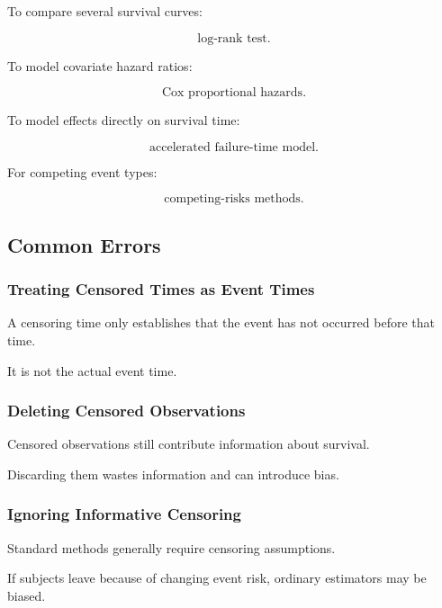 To compare several survival curves:

\[
\boxed{
\text{log-rank test}.
}
\]

To model covariate hazard ratios:

\[
\boxed{
\text{Cox proportional hazards}.
}
\]

To model effects directly on survival time:

\[
\boxed{
\text{accelerated failure-time model}.
}
\]

For competing event types:

\[
\boxed{
\text{competing-risks methods}.
}
\]

\subsection{Common Errors}
\label{subsec:survival-common-errors}

\subsubsection{Treating Censored Times as Event Times}

A censoring time only establishes that the event has not occurred before
that time.

It is not the actual event time.

\subsubsection{Deleting Censored Observations}

Censored observations still contribute information about survival.

Discarding them wastes information and can introduce bias.

\subsubsection{Ignoring Informative Censoring}

Standard methods generally require censoring assumptions.

If subjects leave because of changing event risk, ordinary estimators may
be biased.


